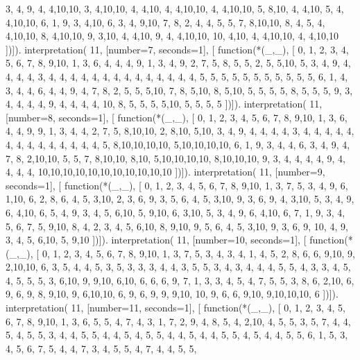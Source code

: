     3, 4, 9, 4, 4,10,10, 3, 4,10,10,
     4, 4,10, 4, 4,10,10, 4, 4,10,10,
     5, 8,10, 4, 4,10, 5, 4, 4,10,10,
     6, 1, 9, 3, 4,10, 6, 3, 4, 9,10,
     7, 8, 2, 4, 4, 5, 5, 7, 8,10,10,
     8, 4, 5, 4, 4,10,10, 8, 4,10,10,
     9, 3,10, 4, 4,10, 9, 4, 4,10,10,
    10, 4,10, 4, 4,10,10, 4, 4,10,10 ])]).
interpretation( 11, [number=7, seconds=1], [
  function(*(_,_), [
     0, 1, 2, 3, 4, 5, 6, 7, 8, 9,10,
     1, 3, 6, 4, 4, 4, 9, 1, 3, 4, 9,
     2, 7, 5, 8, 5, 5, 2, 5, 5,10, 5,
     3, 4, 9, 4, 4, 4, 4, 3, 4, 4, 4,
     4, 4, 4, 4, 4, 4, 4, 4, 4, 4, 4,
     5, 5, 5, 5, 5, 5, 5, 5, 5, 5, 5,
     6, 1, 4, 3, 4, 4, 6, 4, 4, 9, 4,
     7, 8, 2, 5, 5, 5,10, 7, 8, 5,10,
     8, 5,10, 5, 5, 5, 5, 8, 5, 5, 5,
     9, 3, 4, 4, 4, 4, 9, 4, 4, 4, 4,
    10, 8, 5, 5, 5, 5,10, 5, 5, 5, 5 ])]).
interpretation( 11, [number=8, seconds=1], [
  function(*(_,_), [
     0, 1, 2, 3, 4, 5, 6, 7, 8, 9,10,
     1, 3, 6, 4, 4, 9, 9, 1, 3, 4, 4,
     2, 7, 5, 8,10,10, 2, 8,10, 5,10,
     3, 4, 9, 4, 4, 4, 4, 3, 4, 4, 4,
     4, 4, 4, 4, 4, 4, 4, 4, 4, 4, 4,
     5, 8,10,10,10,10, 5,10,10,10,10,
     6, 1, 9, 3, 4, 4, 6, 3, 4, 9, 4,
     7, 8, 2,10,10, 5, 5, 7, 8,10,10,
     8,10, 5,10,10,10,10, 8,10,10,10,
     9, 3, 4, 4, 4, 4, 9, 4, 4, 4, 4,
    10,10,10,10,10,10,10,10,10,10,10 ])]).
interpretation( 11, [number=9, seconds=1], [
  function(*(_,_), [
     0, 1, 2, 3, 4, 5, 6, 7, 8, 9,10,
     1, 3, 7, 5, 3, 4, 9, 6, 1,10, 6,
     2, 8, 6, 4, 5, 3,10, 2, 3, 6, 9,
     3, 5, 6, 4, 5, 3,10, 9, 3, 6, 9,
     4, 3,10, 5, 3, 4, 9, 6, 4,10, 6,
     5, 4, 9, 3, 4, 5, 6,10, 5, 9,10,
     6, 3,10, 5, 3, 4, 9, 6, 4,10, 6,
     7, 1, 9, 3, 4, 5, 6, 7, 5, 9,10,
     8, 4, 2, 3, 4, 5, 6,10, 8, 9,10,
     9, 5, 6, 4, 5, 3,10, 9, 3, 6, 9,
    10, 4, 9, 3, 4, 5, 6,10, 5, 9,10 ])]).
interpretation( 11, [number=10, seconds=1], [
  function(*(_,_), [
     0, 1, 2, 3, 4, 5, 6, 7, 8, 9,10,
     1, 3, 7, 5, 3, 4, 3, 4, 1, 4, 5,
     2, 8, 6, 6, 9,10, 9, 2,10,10, 6,
     3, 5, 4, 4, 5, 3, 5, 3, 3, 3, 4,
     4, 3, 5, 5, 3, 4, 3, 4, 4, 4, 5,
     5, 4, 3, 3, 4, 5, 4, 5, 5, 5, 3,
     6,10, 9, 9,10, 6,10, 6, 6, 6, 9,
     7, 1, 3, 3, 4, 5, 4, 7, 5, 5, 3,
     8, 6, 2,10, 6, 9, 6, 9, 8, 9,10,
     9, 6,10,10, 6, 9, 6, 9, 9, 9,10,
    10, 9, 6, 6, 9,10, 9,10,10,10, 6 ])]).
interpretation( 11, [number=11, seconds=1], [
  function(*(_,_), [
     0, 1, 2, 3, 4, 5, 6, 7, 8, 9,10,
     1, 3, 6, 5, 5, 4, 7, 4, 3, 1, 7,
     2, 9, 4, 8, 5, 4, 2,10, 4, 5, 5,
     3, 5, 7, 4, 4, 5, 4, 5, 5, 3, 4,
     4, 5, 5, 4, 4, 5, 4, 5, 5, 4, 4,
     5, 4, 4, 5, 5, 4, 5, 4, 4, 5, 5,
     6, 1, 5, 3, 4, 5, 6, 7, 5, 4, 4,
     7, 3, 4, 5, 5, 4, 7, 4, 4, 5, 5,
